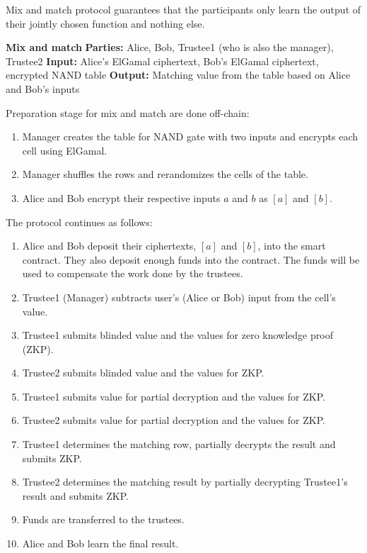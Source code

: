 Mix and match protocol guarantees that the participants only learn the output of their jointly chosen function and nothing else.

\begin{mdframed}
 	\textbf{Mix and match}
 	\newline
 	 \newline
 	\textbf{Parties: } Alice, Bob, Trustee1 (who is also the manager), Trustee2 
 	 \newline
 	\textbf{Input: } Alice's ElGamal ciphertext, Bob's ElGamal ciphertext, encrypted NAND table 
 	\newline
 	\textbf{Output: } Matching value from the table based on Alice and Bob's inputs
 	\newline
 	
	Preparation stage for mix and match are done off-chain:
	\begin{enumerate}
		\item Manager creates the table for NAND gate with two inputs and encrypts each cell using ElGamal. 
		\item Manager shuffles the rows and rerandomizes the cells of the table.
		\item Alice and Bob encrypt their respective inputs $a$ and $b$ as $[a]$ and $[b]$.
	\end{enumerate}

 	The protocol continues as follows:
 	\begin{enumerate}
 		\item Alice and Bob deposit their ciphertexts, $[a]$ and $[b]$, into the smart contract. They also deposit enough funds into the contract. The funds will be used to compensate the work done by the trustees.
 		\item Trustee1 (Manager) subtracts user's (Alice or Bob) input from the cell's value.
 		\item Trustee1 submits blinded value and the values for zero knowledge proof (ZKP).
 		\item Trustee2 submits blinded value and the values for ZKP.
 		\item Trustee1 submits value for partial decryption and the values for ZKP.
 		\item Trustee2 submits value for partial decryption and the values for ZKP.
 		\item Trustee1 determines the matching row, partially decrypts the result and submits ZKP.
 		\item Trustee2  determines the matching result by partially decrypting Trustee1's result and submits ZKP.
 		\item Funds are transferred to the trustees.
 		\item Alice and Bob learn the final result.
 	\end{enumerate}
\end{mdframed}


